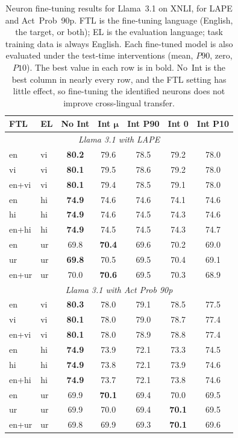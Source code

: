 \begin{table}[ht!]
	\centering
	\renewcommand{\arraystretch}{1.15}
	\setlength{\tabcolsep}{6pt}
	\footnotesize
	\begin{tabular}{llccccc}
		\toprule
		\textbf{FTL} & \textbf{EL} & \textbf{No Int} & \textbf{Int} $\bm{\mu}$ & \textbf{Int P90} & \textbf{Int 0} & \textbf{Int P10} \\
		\midrule
		\multicolumn{7}{c}{\textit{Llama 3.1 with LAPE}} \\
		\midrule
		en     & vi & \textbf{80.2} & 79.6 & 78.5 & 79.2 & 78.0 \\
		vi     & vi & \textbf{80.1} & 79.5 & 78.6 & 79.2 & 78.0 \\
		en+vi  & vi & \textbf{80.1} & 79.4 & 78.5 & 79.1 & 78.0 \\
		\midrule
		en     & hi & \textbf{74.9} & 74.6 & 74.6 & 74.1 & 74.6 \\
		hi     & hi & \textbf{74.9} & 74.6 & 74.5 & 74.3 & 74.6 \\
		en+hi  & hi & \textbf{74.9} & 74.5 & 74.5 & 74.3 & 74.7 \\
		\midrule
		en     & ur & 69.8 & \textbf{70.4} & 69.6 & 70.2 & 69.0 \\
		ur     & ur & \textbf{69.8} & 70.5 & 69.5 & 70.4 & 69.1 \\
		en+ur  & ur & 70.0 & \textbf{70.6} & 69.5 & 70.3 & 68.9 \\
		\midrule
		\multicolumn{7}{c}{\textit{Llama 3.1 with Act Prob 90p}} \\
		\midrule
		en     & vi & \textbf{80.3} & 78.0 & 79.1 & 78.5 & 77.5 \\
		vi     & vi & \textbf{80.1} & 78.0 & 79.0 & 78.7 & 77.4 \\
		en+vi  & vi & \textbf{80.1} & 78.0 & 78.9 & 78.8 & 77.4 \\
		\midrule
		en     & hi & \textbf{74.9} & 73.9 & 72.1 & 73.3 & 74.5 \\
		hi     & hi & \textbf{74.9} & 73.8 & 72.1 & 73.9 & 74.6 \\
		en+hi  & hi & \textbf{74.9} & 73.7 & 72.1 & 73.8 & 74.6 \\
		\midrule
		en     & ur & 69.9 & \textbf{70.1} & 69.4 & 70.0 & 69.5 \\
		ur     & ur & 69.9 & 70.0 & 69.4 & \textbf{70.1} & 69.5 \\
		en+ur  & ur & 69.8 & 69.9 & 69.3 & \textbf{70.1} & 69.6 \\
		\bottomrule
	\end{tabular}
	\caption{Neuron fine-tuning results for Llama~3.1 on XNLI, for LAPE and
		Act~Prob~90p. FTL is the fine-tuning language (English, the target, or both);
		EL is the evaluation language; task training data is always English. Each
		fine-tuned model is also evaluated under the test-time interventions (mean,
		$P90$, zero, $P10$). The best value in each row is in bold. No~Int is the best
		column in nearly every row, and the FTL setting has little effect, so
		fine-tuning the identified neurons does not improve cross-lingual transfer.}
	\label{tab:neurons-ft}
\end{table}

